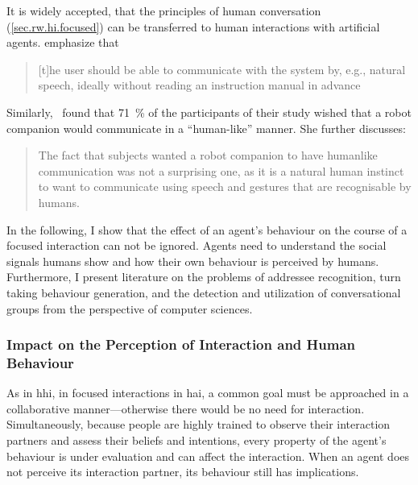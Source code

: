 It is widely accepted, that the principles of human \gls{conversation} (\cref{sec.rw.hi.focused}) can be transferred to human interactions with \glspl{artificial agent}.
 emphasize that \blockcquote[]{Spexard2007}{[t]he user should be able to communicate with the system by, e.g., natural speech, ideally without reading an instruction manual in advance}.
Similarly,~ found that \SI{71}{\percent} of the participants of their study wished that a \gls{robot} companion would communicate in a \enquote{human-like} manner.
She further discusses: \blockcquote[]{Dautenhahn2005}{The fact that subjects wanted a \gls{robot} companion to have
humanlike communication was not a surprising one, as it is a natural human instinct to want to communicate using speech and gestures that are recognisable by humans.\\}
In the following, I show that the effect of an agent's behaviour on the course of a \gls{focused interaction} can not be ignored.
Agents need to understand the social signals humans show and how their own behaviour is perceived by humans. 
Furthermore, I present literature on the problems of \gls{addressee} recognition, \gls{turn taking} behaviour generation, and the detection and utilization of \glspl{conversational group} from the perspective of computer sciences.

\subsubsection{Impact on the Perception of Interaction and Human Behaviour}\label{sec.rw.hi.focused-rw.perception}
As in \gls{hhi}, in \glspl{focused interaction} in \gls{hai}, a common goal must be approached in a collaborative manner---otherwise there would be no need for interaction.
Simultaneously, because people are highly trained to observe their interaction partners and assess their beliefs and intentions, every property of the agent's behaviour is under evaluation and can affect the interaction.
When an agent does not perceive its interaction partner, its behaviour still has implications.

